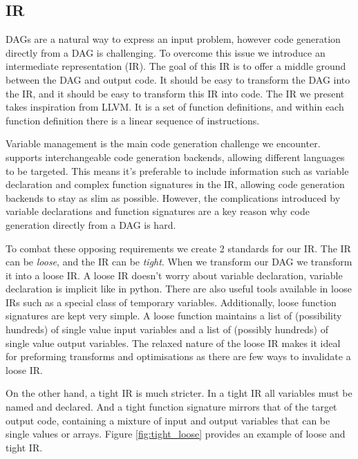 \subsection{IR} \label{sec:IR}


DAGs are a natural way to express an input problem, however code generation directly from a DAG is challenging.
To overcome this issue we introduce an intermediate representation (IR).
The goal of this IR is to offer a middle ground between the DAG and output code.
It should be easy to transform the DAG into the IR, and it should be easy to transform this IR into code.
The IR we present takes inspiration from LLVM.
It is a set of function definitions, and within each function definition there is a linear sequence of instructions.

Variable management is the main code generation challenge we encounter.
\phlat supports interchangeable code generation backends, allowing different languages to be targeted.
This means it's preferable to include information such as variable declaration and complex function signatures in the IR, allowing code generation backends to stay as slim as possible.
However, the complications introduced by variable declarations and function signatures are a key reason why code generation directly from a DAG is hard.   


To combat these opposing requirements we create 2 standards for our IR.
The IR can be \textit{loose}, and the IR can be \textit{tight}.
When we transform our DAG we transform it into a loose IR.
A loose IR doesn't worry about variable declaration, variable declaration is implicit like in python.
There are also useful tools available in loose IRs such as a special class of temporary variables.
Additionally, loose function signatures are kept very simple.
A loose function maintains a list of (possibility hundreds) of single value input variables and a list of (possibly hundreds) of single value output variables.
The relaxed nature of the loose IR makes it ideal for preforming transforms and optimisations as there are few ways to invalidate a loose IR.

On the other hand, a tight IR is much stricter.
In a tight IR all variables must be named and declared.
And a tight function signature mirrors that of the target output code, containing a mixture of input and output variables that can be single values or arrays.
Figure \ref{fig:tight_loose} provides an example of loose and tight IR. 

